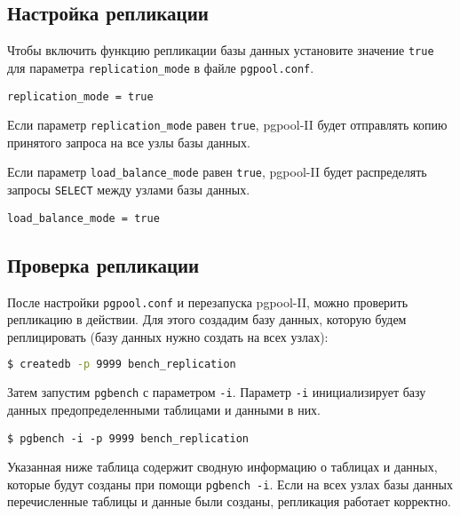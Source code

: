 \subsection{Настройка репликации}

Чтобы включить функцию репликации базы данных установите значение \lstinline!true! для параметра \lstinline!replication_mode! в файле \lstinline!pgpool.conf!.

\begin{lstlisting}[label=lst:pgpool17,caption=Настройка репликации]
replication_mode = true
\end{lstlisting}

Если параметр \lstinline!replication_mode! равен \lstinline!true!, pgpool-II будет отправлять копию принятого запроса на все узлы базы данных.

Если параметр \lstinline!load_balance_mode! равен \lstinline!true!, pgpool-II будет распределять запросы \lstinline!SELECT! между узлами базы данных.

\begin{lstlisting}[label=lst:pgpool18,caption=Настройка репликации]
load_balance_mode = true
\end{lstlisting}

\subsection{Проверка репликации}

После настройки \lstinline!pgpool.conf! и перезапуска pgpool-II, можно проверить репликацию в действии. Для этого создадим базу данных, которую будем реплицировать (базу данных нужно создать на всех узлах):

\begin{lstlisting}[language=Bash,label=lst:pgpool19,caption=Проверка репликации]
$ createdb -p 9999 bench_replication
\end{lstlisting}

Затем запустим \lstinline!pgbench! с параметром \lstinline!-i!. Параметр \lstinline!-i! инициализирует базу данных предопределенными таблицами и данными в них.

\begin{lstlisting}[label=lst:pgpool20,caption=Проверка репликации]
$ pgbench -i -p 9999 bench_replication
\end{lstlisting}

Указанная ниже таблица содержит сводную информацию о таблицах и данных, которые будут созданы при помощи \lstinline!pgbench -i!. Если на всех узлах базы данных перечисленные таблицы и данные были созданы, репликация работает корректно.

